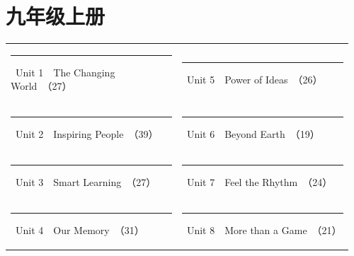 \documentclass[UTF8,a4paper,11pt,oneside]{ctexbook}
\begin{document}
\chapter{九年级上册}
\par\noindent{\color{volcolor}\rule{\linewidth}{2.6pt}}\par
\vspace{0.3em}
\par
\vspace{1.0em}
\par
\vspace{0.35em}
\noindent\begin{tabular}{@{}p{0.48\linewidth}p{0.48\linewidth}@{}}
{\color{volcolor}\rule[0.3ex]{0.85ex}{0.85ex}}~Unit 1　The Changing World~{\footnotesize\color{textgray!80}（27）} & {\color{volcolor}\rule[0.3ex]{0.85ex}{0.85ex}}~Unit 5　Power of Ideas~{\footnotesize\color{textgray!80}（26）} \\
{\color{volcolor}\rule[0.3ex]{0.85ex}{0.85ex}}~Unit 2　Inspiring People~{\footnotesize\color{textgray!80}（39）} & {\color{volcolor}\rule[0.3ex]{0.85ex}{0.85ex}}~Unit 6　Beyond Earth~{\footnotesize\color{textgray!80}（19）} \\
{\color{volcolor}\rule[0.3ex]{0.85ex}{0.85ex}}~Unit 3　Smart Learning~{\footnotesize\color{textgray!80}（27）} & {\color{volcolor}\rule[0.3ex]{0.85ex}{0.85ex}}~Unit 7　Feel the Rhythm~{\footnotesize\color{textgray!80}（24）} \\
{\color{volcolor}\rule[0.3ex]{0.85ex}{0.85ex}}~Unit 4　Our Memory~{\footnotesize\color{textgray!80}（31）} & {\color{volcolor}\rule[0.3ex]{0.85ex}{0.85ex}}~Unit 8　More than a Game~{\footnotesize\color{textgray!80}（21）} \\
\end{tabular}
\vspace{1.3em}
\end{document}
